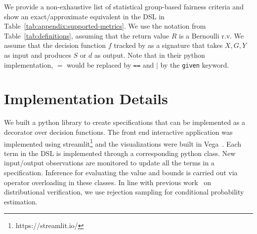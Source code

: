 \begin{subappendices}
We provide a non-exhaustive list of statistical group-based fairness criteria and show an exact/approximate equivalent in the \AVOIRmethodname{} DSL in Table~\ref{tab:appendix:supported-metrics}.
We use the notation from Table~\ref{tab:definitions}, assuming that the return value $R$ is a Bernoulli r.v.
We assume that the decision function $f$ tracked by \AVOIRmethodname{} as a signature that takes $X, G, Y$ as input and produces $S$ or $d$ as output.
Note that in their python implementation, $=$ would be replaced by \lstinline{==} and $|$ by the \lstinline{given} keyword.

\section{Implementation Details}
We built a python library to create specifications that can be implemented as a decorator over decision functions. 
The front end interactive application was implemented using streamlit\footnote{https://streamlit.io/} and the visualizations were built in Vega~\cite{satyanarayan2015reactive}.
Each term in the DSL is implemented through a corresponding python class.
New input/output observations are monitored to update all the terms in a specification.
Inference for evaluating the value and bounds is carried out via operator overloading in these classes. 
In line with previous work~\citep{albarghouthi2017fairsquare,bastani2019probabilistic,albarghouthi2019fairness} on distributional verification, we use rejection sampling for conditional probability estimation.




\end{subappendices}
